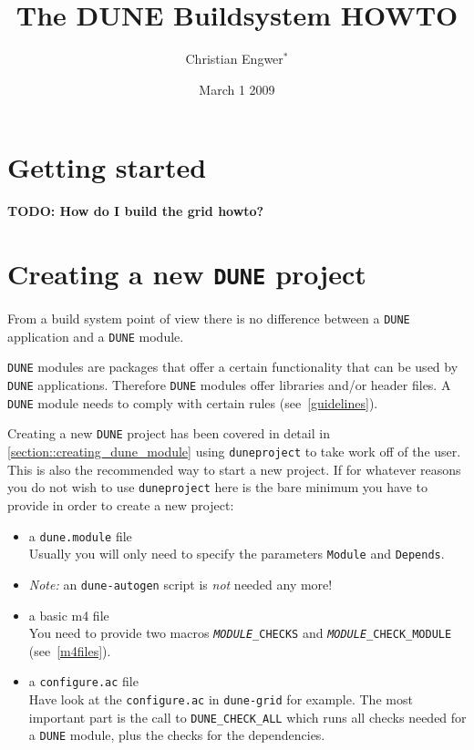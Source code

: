 \documentclass[11pt,a4paper,headinclude,footinclude,DIV16,normalheadings]{scrartcl}
\title{The DUNE Buildsystem HOWTO}
\author{Christian Engwer$^\ast$ 
}
\date{March 1 2009}
\newcommand{\dune}{\texttt{DUNE}\xspace}
\newcommand{\autogen}{\texttt{dune-autogen}\xspace}
\newcommand{\configureac}{\texttt{configure.ac}\xspace}
\newcommand{\dunegrid}{\texttt{dune-grid}\xspace}
\newcommand{\duneproject}{\texttt{duneproject}\xspace}
\newcommand{\dunemodule}{\texttt{dune.module}\xspace}
\begin{document}
\maketitle
\tableofcontents
\pagebreak

\section{Getting started}\label{section::getting_started}

\textbf{TODO: How do I build the grid howto?}

\section{Creating a new \dune project}\label{section::creating_new_dune_project}

From a build system point of view there is no difference between a \dune
application and a \dune module.

\dune modules are packages that offer a certain functionality that can
be used by \dune applications. Therefore \dune modules offer libraries
and/or header files. A \dune module needs to comply with certain rules
(see~\ref{guidelines}).

Creating a new \dune project has been covered in detail in 
\ref{section::creating_dune_module} using \texttt{duneproject} to take
work off of the user. This is also the recommended way to start a new project. 
If for whatever reasons you do not wish to use \duneproject here is 
the bare minimum you have to provide in order to create a new project:
\begin{itemize}
\item a \dunemodule file\\
  Usually you will only need to specify the parameters \texttt{Module}
  and \texttt{Depends}.
\item \emph{Note:} an \autogen script is \emph{not} needed any more!
\item a basic m4 file\\
  You need to provide two macros \texttt{\emph{MODULE}\_CHECKS}
  and \texttt{\emph{MODULE}\_CHECK\_MODULE} (see~\ref{m4files}).
\item a \configureac file\\
  Have look at the \configureac in \dunegrid for example. The most
  important part is the call to \texttt{DUNE\_CHECK\_ALL} which
  runs all checks needed for a \dune module, plus the checks for the
  dependencies.
\end{itemize}
\end{document}

